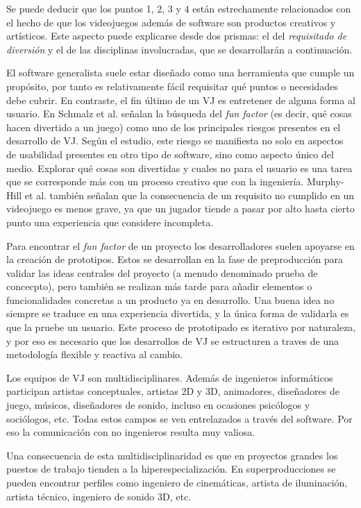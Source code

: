 Se puede deducir que los puntos 1, 2, 3 y 4 están estrechamente relacionados con el hecho de que los videojuegos además de software son productos creativos y artísticos. Este aspecto puede explicarse desde dos prismas: el del \textit{requisitado de diversión} y el de las disciplinas involucradas, que se desarrollarán a continuación.

El software generalista suele estar diseñado como una herramienta que cumple un propósito, por tanto es relativamente fácil requisitar qué puntos o necesidades debe cubrir. En contraste, el fin último de un VJ es entretener de alguna forma al usuario. En Schmalz et al.\cite{mark-schmalz} señalan la búsqueda del \textit{fun factor} (es decir, qué cosas hacen divertido a un juego) como uno de los principales riesgos presentes en el desarrollo de VJ. Según el estudio, este riesgo se manifiesta no solo en aspectos de usabilidad presentes en otro tipo de software, sino como aspecto único del medio. Explorar qué cosas son divertidas y cuales no para el usuario es una tarea que se corresponde más con un proceso creativo que con la ingeniería. Murphy-Hill et al. también señalan que la consecuencia de un requisito no cumplido en un videojuego es menos grave, ya que un jugador tiende a pasar por alto hasta cierto punto una experiencia que considere incompleta.

Para encontrar el \textit{fun factor} de un proyecto los desarrolladores suelen apoyarse en la creación de prototipos. Estos se desarrollan en la fase de preproducción para validar las ideas centrales del proyecto (a menudo denominado prueba de concecpto), pero también se realizan más tarde para añadir elementos o funcionalidades concretas a un producto ya en desarrollo. Una buena idea no siempre se traduce en una experiencia divertida, y la única forma de validarla es que la pruebe un usuario. Este proceso de prototipado es iterativo por naturaleza, y por eso es necesario que los desarrollos de VJ se estructuren a traves de una metodología flexible y reactiva al cambio. 

Los equipos de VJ son multidisciplinares. Además de ingenieros informáticos participan artistas conceptuales, artistas 2D y 3D, animadores, diseñadores de juego, músicos, diseñadores de sonido, incluso en ocasiones psicólogos y sociólogos, etc. Todas estos campos se ven entrelazados a través del software. Por eso la comunicación con no ingenieros resulta muy valiosa.

Una consecuencia de esta multidisciplinaridad es que en proyectos grandes los puestos de trabajo tienden a la hiperespecialización. En superproducciones se pueden encontrar perfiles como ingeniero de cinemáticas, artista de iluminación, artista técnico, ingeniero de sonido 3D, etc.

